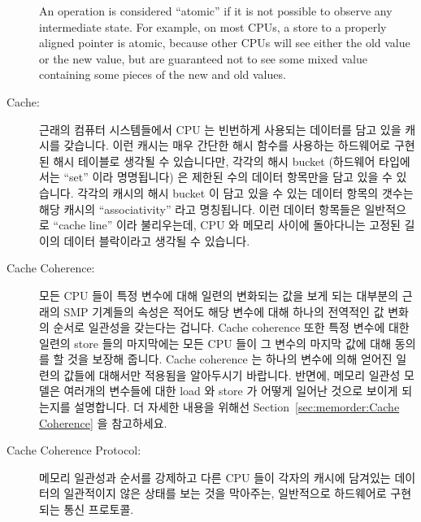 \begin{description}
	An operation is considered ``atomic'' if it is not possible to
	observe any intermediate state.
	For example, on most CPUs, a store to a properly aligned pointer
	is atomic, because other CPUs will see either the old value or
	the new value, but are guaranteed not to see some mixed value
	containing some pieces of the new and old values.
	\fi
\item[Cache:]
	근래의 컴퓨터 시스템들에서 CPU 는 빈번하게 사용되는 데이터를 담고 있을
	캐시를 갖습니다.
	이런 캐시는 매우 간단한 해시 함수를 사용하는 하드웨어로 구현된 해시
	테이블로 생각될 수 있습니다만, 각각의 해시 bucket (하드웨어 타입에서는
	``set'' 이라 명명됩니다) 은 제한된 수의 데이터 항목만을 담고 있을 수
	있습니다.
	각각의 캐시의 해시 bucket 이 담고 있을 수 있는 데이터 항목의 갯수는
	해당 캐시의 ``associativity'' 라고 명칭됩니다.
	이런 데이터 항목들은 일반적으로 ``cache line'' 이라 불리우는데, CPU 와
	메모리 사이에 돌아다니는 고정된 길이의 데이터 블락이라고 생각될 수
	있습니다.
	\iffalse

	In modern computer systems, CPUs have caches in which to hold
	frequently used data.
	These caches can be thought of as hardware hash tables with very
	simple hash functions,
	but in which each hash bucket (termed a ``set'' by hardware types)
	can hold only a limited number of data items.
	The number of data items that can be held by each of a cache's hash
	buckets is termed the cache's ``associativity''.
	These data items are normally called ``cache lines'', which
	can be thought of a fixed-length blocks of data that circulate
	among the CPUs and memory.
	\fi
\item[Cache Coherence:]
	모든 CPU 들이 특정 변수에 대해 일련의 변화되는 값을 보게 되는 대부분의
	근래의 SMP 기계들의 속성은 적어도 해당 변수에 대해 하나의 전역적인 값
	변화의 순서로 일관성을 갖는다는 겁니다.
	Cache coherence 또한 특정 변수에 대한 일련의 store 들의 마지막에는 모든
	CPU 들이 그 변수의 마지막 값에 대해 동의를 할 것을 보장해 줍니다.
	Cache coherence 는 하나의 변수에 의해 얻어진 일련의 값들에 대해서만
	적용됨을 알아두시기 바랍니다.
	반면에, 메모리 일관성 모델은 여러개의 변수들에 대한 load 와 store 가
	어떻게 일어난 것으로 보이게 되는지를 설명합니다.
	더 자세한 내용을 위해선
	Section~\ref{sec:memorder:Cache Coherence} 을
	참고하세요.
	\iffalse

	A property of most modern SMP machines where all CPUs will
	observe a sequence of values for a given variable that is
	consistent with at least one global order of values for
	that variable.
	Cache coherence also guarantees that at the end of a group
	of stores to a given variable, all CPUs will agree
	on the final value for that variable.
	Note that cache coherence applies only to the series of values
	taken on by a single variable.
	In contrast, the memory consistency model for a given machine
	describes the order in which loads and stores to groups of
	variables will appear to occur.
	See Section~\ref{sec:memorder:Cache Coherence}
	for more information.
	\fi
\item[Cache Coherence Protocol:]
	메모리 일관성과 순서를 강제하고 다른 CPU 들이 각자의 캐시에 담겨있는
	데이터의 일관적이지 않은 상태를 보는 것을 막아주는, 일반적으로
	하드웨어로 구현되는 통신 프로토콜.
	\iffalse


\end{description}

